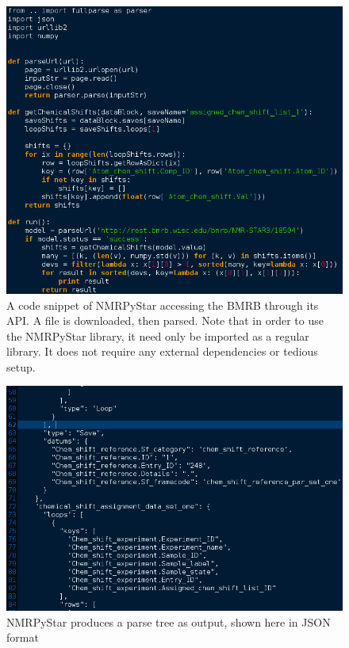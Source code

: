 \begin{figure}
  \includegraphics[scale=0.5]{figures/nmrpystar_bmrb}
  \caption[A code snippet of NMRPyStar]
          {A code snippet of NMRPyStar accessing the BMRB through its API.
           A file is downloaded, then parsed.  Note that in order to use
           the NMRPyStar library, it need only be imported as a regular
           library.  It does not require any external dependencies or
           tedious setup.}
  \label{nmrpystar_bmrb}
\end{figure}

\begin{figure}
  \includegraphics[scale=0.5]{figures/nmrpystar_json}
  \caption[NMRPyStar produces a parse tree as output]
          {NMRPyStar produces a parse tree as output, shown here in JSON format}
  \label{nmrpystar_json}
\end{figure}


